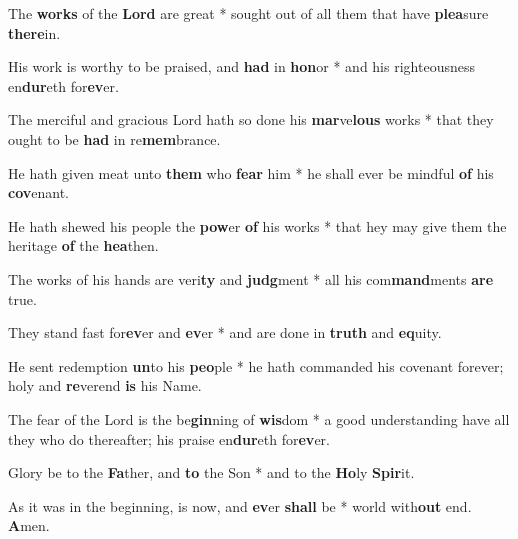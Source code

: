 \begin{multicols}{2}
	The \textbf{works} of the \textbf{Lord} are great * sought out of all them that have \textbf{plea}sure \textbf{there}in.
	
	His work is worthy to be praised, and \textbf{had} in \textbf{hon}or * and his righteousness en\textbf{dur}eth for\textbf{ev}er.
	
	The merciful and gracious Lord hath so done his \textbf{mar}ve\textbf{lous} works * that they ought to be \textbf{had} in re\textbf{mem}brance.
	
	He hath given meat unto \textbf{them} who \textbf{fear} him * he shall ever be mindful \textbf{of} his \textbf{cov}enant.
	
	He hath shewed his people the \textbf{pow}er \textbf{of} his works * that hey may give them the heritage \textbf{of} the \textbf{hea}then.
	
	The works of his hands are veri\textbf{ty} and \textbf{judg}ment * all his com\textbf{mand}ments \textbf{are} true.
	
	They stand fast for\textbf{ev}er and \textbf{ev}er * and are done in \textbf{truth} and \textbf{eq}uity.
	
	He sent redemption \textbf{un}to his \textbf{peo}ple * he hath commanded his covenant forever; holy and \textbf{re}verend \textbf{is} his Name.
	
	The fear of the Lord is the be\textbf{gin}ning of \textbf{wis}dom * a good understanding have all they who do thereafter; his praise en\textbf{dur}eth for\textbf{ev}er.
	
	Glory be to the \textbf{Fa}ther, and \textbf{to} the Son * and to the \textbf{Ho}ly \textbf{Spir}it.
	
	As it was in the beginning, is now, and \textbf{ev}er \textbf{shall} be * world with\textbf{out} end. \textbf{A}men.
\end{multicols}